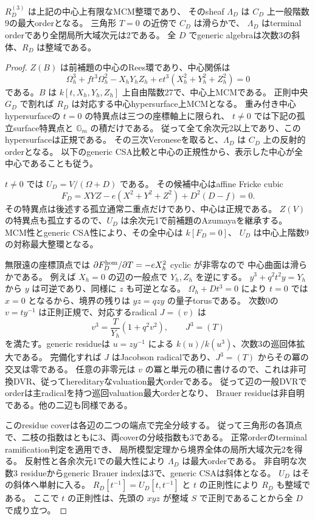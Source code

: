 \begin{lemma}
\label{lem:quantum-triangle-terminal-boundary}
$R_D^{(3)}$ は上記の中心上有限なMCM整環であり、
そのsheaf $\Lambda_D$ は $C_D$ 上一般階数9の最大orderとなる。
三角形 $T=0$ の近傍で $C_D$ は滑らかで、
$\Lambda_D$ はterminal orderであり全閉局所大域次元は2である。
全 $D$ でgeneric algebraは次数3の斜体、$R_D$ は整域である。
\end{lemma}
\begin{proof}
$Z(B)$ は前補題の中心のRees環であり、中心関係は
\[
 \Omega_h^3+ft^3\Omega_h^2-X_hY_hZ_h
       +et^3(X_h^2+Y_h^2+Z_h^2)=0
\]
である。$B$ は $k[t,X_h,Y_h,Z_h]$ 上自由階数27で、中心上MCMである。
正則中央 $G_D$ で割れば $R_D$ は対応する中心hypersurface上MCMとなる。
重み付き中心hypersurfaceの $t=0$ の特異点は三つの座標軸上に限られ、
$t\ne0$ では下記の孤立surface特異点と $\mathbb G_m$ の積だけである。
従って全て余次元2以上であり、このhypersurfaceは正規である。
その三次Veroneseを取ると、$\Lambda_D$ は $C_D$ 上の反射的orderとなる。
以下のgeneric CSA比較と中心の正規性から、表示した中心が全中心であることも従う。

$t\ne0$ では $U_D=V/(\Omega+D)$ である。
その候補中心はaffine Fricke cubic
\[
 F_D=XYZ-e(X^2+Y^2+Z^2)+D^2(D-f)=0.
\]
その特異点は後述する孤立通常二重点だけであり、中心は正規である。
$Z(V)$ の特異点も孤立するので、$U_D$ は余次元1で前補題のAzumayaを継承する。
MCM性とgeneric CSA性により、その全中心は $k[F_D=0]$、
$U_D$ は中心上階数9の対称最大整環となる。

無限遠の座標頂点では $\partial F_D^{\rm hom}/\partial T=-eX_h^2$ cyclic が非零なので
中心曲面は滑らかである。
例えば $X_h=0$ の辺の一般点で $Y_h,Z_h$ を逆にする。
$y^3+q^2t^2y=Y_h$ から $y$ は可逆であり、同様に $z$ も可逆となる。
$\Omega_h+Dt^3=0$ により $t=0$ では $x=0$ となるから、境界の残りは
$yz=qzy$ の量子torusである。
次数0の $v=ty^{-1}$ は正則正規で、対応するradical $J=(v)$ は
\[
 v^3=\frac{T}{Y_h}(1+q^2v^2),\qquad J^3=(T)
\]
を満たす。generic residueは $u=zy^{-1}$ による
$k(u)/k(u^3)$、次数3の巡回体拡大である。
完備化すれば $J$ はJacobson radicalであり、$J^3=(T)$ からその冪の交叉は零である。
任意の非零元は $v$ の冪と単元の積に書けるので、これは非可換DVR、従ってhereditaryなvaluation最大orderである。
従って辺の一般DVRでorderは主radicalを持つ巡回valuation最大orderとなり、
Brauer residueは非自明である。他の二辺も同様である。

このresidue coverは各辺の二つの端点で完全分岐する。
従って三角形の各頂点で、二枝の指数はともに3、両coverの分岐指数も3である。
正常orderのterminal ramification判定\cite[Theorem 2.7]{CHIOrders}を適用でき、
局所模型定理\cite[Theorem 2.17]{CHIOrders}から境界全体の局所大域次元2を得る。
反射性と各余次元1での最大性により $\Lambda_D$ は最大orderである。
非自明な次数3 residueからgeneric Brauer indexは3で、generic CSAは斜体となる。
$U_D$ はその斜体へ単射に入る。
$R_D[t^{-1}]=U_D[t,t^{-1}]$ と $t$ の正則性により $R_D$ も整域である。
ここで $t$ の正則性は、先頭の $xyz$ が整域 $S$ で正則であることから全 $D$ で成り立つ。
\end{proof}


